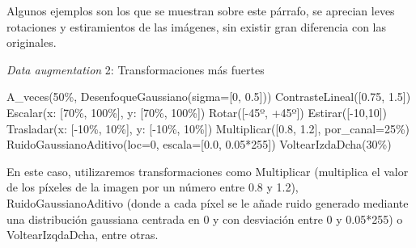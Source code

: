 Algunos ejemplos son los que se muestran sobre este párrafo, se aprecian leves rotaciones y estiramientos de las imágenes, sin existir gran diferencia con las originales.

\begin{algorithm}[H]
    \caption{\textit{Data augmentation} 2: Transformaciones más fuertes}
\begin{algorithmic}[1]
    \State A\_veces(50\%, DesenfoqueGaussiano(sigma=[0, 0.5]))
    \State ContrasteLineal([0.75, 1.5])
    \State Escalar(x: [70\%, 100\%], y: [70\%, 100\%])
    \State Rotar([-45º, +45º])
    \State Estirar([-10,10])
    \State Trasladar(x: [-10\%, 10\%], y: [-10\%, 10\%])
    \State Multiplicar([0.8, 1.2], por\_canal=25\%)
    \State RuidoGaussianoAditivo(loc=0, escala=[0.0, 0.05*255])
    \State VoltearIzdaDcha(30\%)
\end{algorithmic}
\end{algorithm}

En este caso, utilizaremos transformaciones como Multiplicar (multiplica el valor de los píxeles de la imagen por un número entre 0.8 y 1.2), RuidoGaussianoAditivo (donde a cada píxel se le añade ruido generado mediante una distribución gaussiana centrada en 0 y con desviación entre 0 y 0.05*255) o VoltearIzqdaDcha, entre otras.

